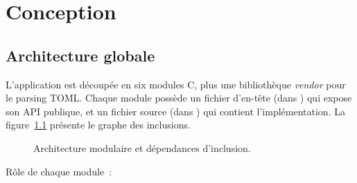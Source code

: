 \chapter{Conception}
\label{chap:conception}

\section{Architecture globale}

L'application est découpée en six modules C, plus une bibliothèque
\emph{vendor} pour le parsing TOML. Chaque module possède un fichier
d'en-tête (dans ) qui expose son API publique, et un
fichier source (dans ) qui contient l'implémentation.
La figure~\ref{fig:architecture} présente le graphe des inclusions.

\begin{figure}[h!]
\centering

\caption{Architecture modulaire et dépendances d'inclusion.}
\label{fig:architecture}
\end{figure}

Rôle de chaque module~:


